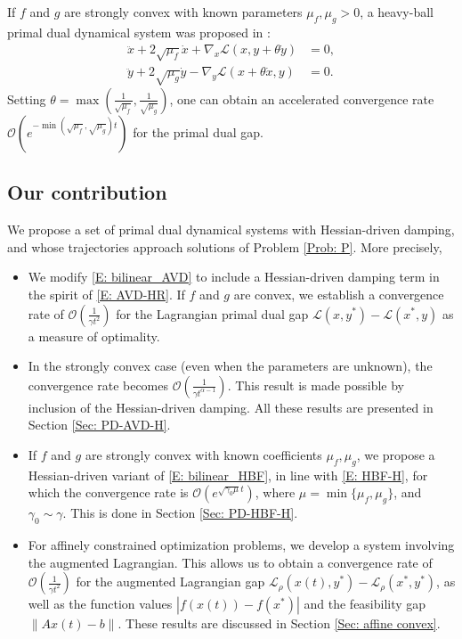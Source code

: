 \documentclass[pdflatex,sn-mathphys-num]{sn-jnl}
\theoremstyle{thmstyleone}
\theoremstyle{thmstyletwo}
\theoremstyle{thmstylethree}
\begin{document}
If $f$ and $g$ are strongly convex with known parameters $\mu_f,\mu_g>0$, a heavy-ball primal dual dynamical system was proposed in \cite{He_2025_PD_SC}:     
\begin{equation}\label{E: bilinear_HBF}
\begin{aligned}
\ddot{x} + 2\sqrt{\mu_f}\dot{x} + \nabla_x \mathcal{L}(x,y+\theta \dot{y}) &= 0,\\
\ddot{y} + 2\sqrt{\mu_g}\dot{y} - \nabla_y \mathcal{L}(x+\theta \dot{x},y) &= 0.
\end{aligned}
\end{equation}
Setting $\theta = \max\left( \frac{1}{\sqrt{\mu_f}}, \frac{1}{\sqrt{\mu_g}} \right)$, one can obtain an accelerated convergence rate $\mathcal{O}\left( e^{-\min(\sqrt{\mu_f},\sqrt{\mu_g}) t} \right)$ for the primal dual gap.




\subsection*{Our contribution}

We propose a set of primal dual dynamical systems with Hessian-driven damping, and whose trajectories approach solutions of Problem \eqref{Prob: P}. More precisely,
\begin{itemize}
\item We modify \eqref{E: bilinear_AVD} to include a Hessian-driven damping term in the spirit of \eqref{E: AVD-HR}. If $f$ and $g$ are convex, we establish a convergence rate of $\mathcal O(\frac{1}{\gamma t^2})$ for the Lagrangian primal dual gap $\mathcal{L}(x,y^*) - \mathcal{L}(x^*,y)$ as a measure of optimality.

\item In the strongly convex case (even when the parameters are unknown), the convergence rate becomes $\mathcal O(\frac{1}{\gamma t^{\alpha-1}})$. This result is made possible by inclusion of the Hessian-driven damping. All these results are presented in Section \ref{Sec: PD-AVD-H}.

\item If $f$ and $g$ are strongly convex with known coefficients $\mu_f,\mu_g$, we propose a Hessian-driven variant of \eqref{E: bilinear_HBF}, in line with \eqref{E: HBF-H}, for which the convergence rate is $\mathcal O(e^{\sqrt{\gamma_0\mu}t})$, where $\mu=\min\{\mu_f,\mu_g\}$, and $\gamma_0\sim\gamma$. This is done in Section \ref{Sec: PD-HBF-H}.

\item For affinely constrained optimization problems, we develop a system involving the augmented Lagrangian. This allows us to obtain a convergence rate of $\mathcal O(\frac{1}{\gamma t^2})$ for the augmented Lagrangian gap $\mathcal{L}_\rho\left(x(t),y^*\right) - \mathcal{L}_\rho(x^*,y^*)$, as well as the function values $|f\left( x(t) \right) - f(x^*) |$ and the feasibility gap $\|Ax(t)-b\|$. These results are discussed in Section \ref{Sec: affine convex}.
\end{itemize}
\end{document}
